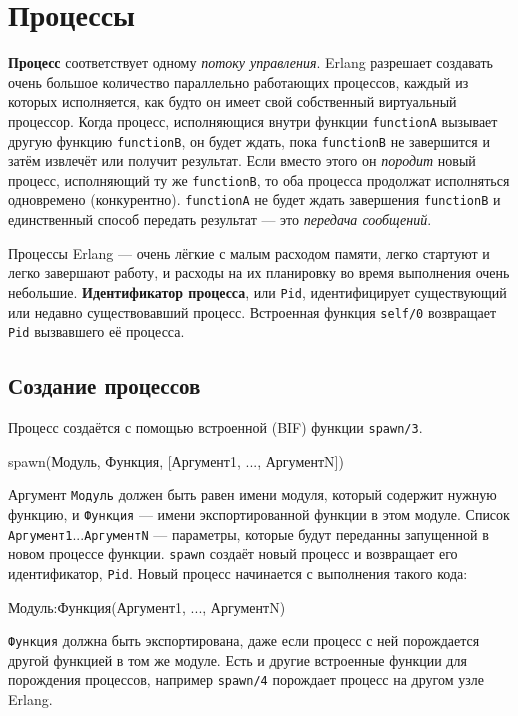 \chapter{Процессы}
\label{processes}

\textbf{Процесс} соответствует одному \emph{потоку управления}. Erlang разрешает
создавать очень большое количество параллельно работающих процессов, каждый из
которых исполняется, как будто он имеет свой собственный виртуальный процессор.
Когда процесс, исполняющися внутри функции \texttt{functionA} вызывает другую
функцию \texttt{functionB}, он будет ждать, пока \texttt{functionB} не завершится
и затём извлечёт или получит результат. Если вместо этого он \emph{породит} новый 
процесс, исполняющий ту же \texttt{functionB}, то оба процесса продолжат 
исполняться одновремено (конкурентно).  \texttt{functionA} не будет ждать 
завершения \texttt{functionB} и единственный способ передать результат --- это
\emph{передача сообщений}.

Процессы Erlang --- очень лёгкие с малым расходом памяти, легко стартуют и легко
завершают работу, и расходы на их планировку во время выполнения очень небольшие.
\textbf{Идентификатор процесса}, или \texttt{Pid}, идентифицирует существующий или 
недавно существовавший процесс. Встроенная функция \texttt{self/0} возвращает
\texttt{Pid} вызвавшего её процесса.


\section{Создание процессов}
Процесс создаётся с помощью встроенной (BIF) функции \texttt{spawn/3}.

\begin{erlangru}
spawn(Модуль, Функция, [Аргумент1, ..., АргументN])
\end{erlangru}

Аргумент \texttt{Модуль} должен быть равен имени модуля, который содержит нужную 
функцию, и \texttt{Функция} --- имени экспортированной функции в этом модуле.
Список \texttt{Аргумент1}$...$\texttt{АргументN} --- параметры, которые будут 
переданны запущенной в новом процессе функции.  \texttt{spawn} создаёт новый
процесс и возвращает его идентификатор, \texttt{Pid}. Новый процесс начинается с 
выполнения такого кода:

\begin{erlangru}
Модуль:Функция(Аргумент1, ..., АргументN)
\end{erlangru}

\texttt{Функция} должна быть экспортирована, даже если процесс с ней порождается
другой функцией в том же модуле.  Есть и другие встроенные функции для порождения
процессов, например \texttt{spawn/4} порождает процесс на другом узле Erlang.


